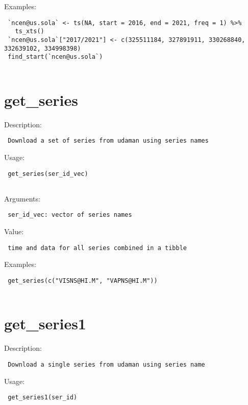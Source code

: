 \documentclass[
  letterpaper,
  DIV=11,
  numbers=noendperiod]{scrreport}
\begin{document}
Examples:

\begin{verbatim}
 `ncen@us.sola` <- ts(NA, start = 2016, end = 2021, freq = 1) %>% 
   ts_xts()
 `ncen@us.sola`["2017/2021"] <- c(325511184, 327891911, 330268840, 332639102, 334998398)
 find_start(`ncen@us.sola`)
 
\end{verbatim}

\section{get\_series}\label{get_series}

Description:

\begin{verbatim}
 Download a set of series from udaman using series names
\end{verbatim}

Usage:

\begin{verbatim}
 get_series(ser_id_vec)
 
\end{verbatim}

Arguments:

\begin{verbatim}
 ser_id_vec: vector of series names
\end{verbatim}

Value:

\begin{verbatim}
 time and data for all series combined in a tibble
\end{verbatim}

Examples:

\begin{verbatim}
 get_series(c("VISNS@HI.M", "VAPNS@HI.M"))
 
\end{verbatim}

\section{get\_series1}\label{get_series1}

Description:

\begin{verbatim}
 Download a single series from udaman using series name
\end{verbatim}

Usage:

\begin{verbatim}
 get_series1(ser_id)
 
\end{verbatim}
\end{document}
